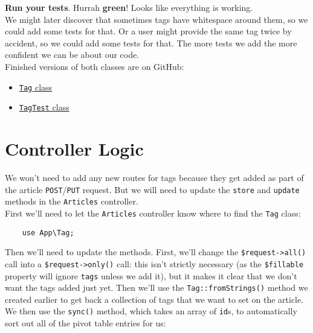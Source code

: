\textbf{Run your tests}. Hurrah \textbf{green}! Looks like everything is working.
\\

We might later discover that sometimes tags have whitespace around them, so we could add some tests for that. Or a user might provide the same tag twice by accident, so we could add some tests for that. The more tests we add the more confident we can be about our code.
\\

Finished versions of both classes are on GitHub:

\begin{itemize}
    \item \href{https://github.com/develop-me/bootcamp--laravel-project/blob/develop/app/Tag.php}{\texttt{Tag} class}
    \item \href{https://github.com/develop-me/bootcamp--laravel-project/blob/develop/tests/Unit/TagTest.php}{\texttt{TagTest} class}
\end{itemize}


\section{Controller Logic}

We won't need to add any new routes for tags because they get added as part of the article \texttt{POST}/\texttt{PUT} request. But we will need to update the \texttt{store} and \texttt{update} methods in the \texttt{Articles} controller.
\\

First we'll need to let the \texttt{Articles} controller know where to find the \texttt{Tag} class:

\begin{verbatim}
    use App\Tag;
\end{verbatim}

Then we'll need to update the methods. First, we'll change the \texttt{\$request->all()} call into a \texttt{\$request->only()} call: this isn't strictly necessary (as the \texttt{\$fillable} property will ignore \texttt{tags} unless we add it), but it makes it clear that we don't want the tags added just yet. Then we'll use the \texttt{Tag::fromStrings()} method we created earlier to get back a collection of tags that we want to set on the article. We then use the \texttt{sync()} method, which takes an array of \texttt{id}s, to automatically sort out all of the pivot table entries for us:


